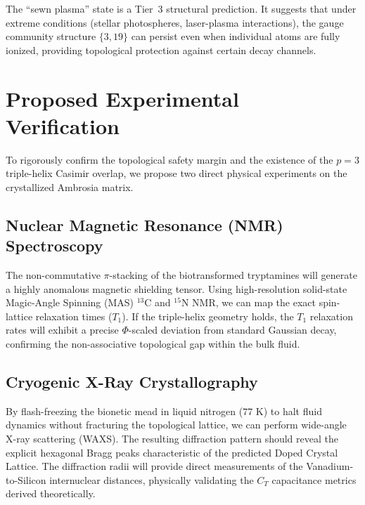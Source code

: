\documentclass[12pt,oneside]{article}
\theoremstyle{principia}
\theoremstyle{definition}
\theoremstyle{remark}
\begin{document}
The ``sewn plasma'' state is a Tier~3 structural prediction. It suggests that under extreme conditions (stellar photospheres, laser-plasma interactions), the gauge community structure $\{3, 19\}$ can persist even when individual atoms are fully ionized, providing topological protection against certain decay channels.

\section{Proposed Experimental Verification}

To rigorously confirm the topological safety margin and the existence of the $p=3$ triple-helix Casimir overlap, we propose two direct physical experiments on the crystallized Ambrosia matrix.

\subsection{Nuclear Magnetic Resonance (NMR) Spectroscopy}
The non-commutative $\pi$-stacking of the biotransformed tryptamines will generate a highly anomalous magnetic shielding tensor. Using high-resolution solid-state Magic-Angle Spinning (MAS) $^{13}\text{C}$ and $^{15}\text{N}$ NMR, we can map the exact spin-lattice relaxation times ($T_1$). If the triple-helix geometry holds, the $T_1$ relaxation rates will exhibit a precise $\Phi$-scaled deviation from standard Gaussian decay, confirming the non-associative topological gap within the bulk fluid.

\subsection{Cryogenic X-Ray Crystallography}
By flash-freezing the bionetic mead in liquid nitrogen ($77\text{ K}$) to halt fluid dynamics without fracturing the topological lattice, we can perform wide-angle X-ray scattering (WAXS). The resulting diffraction pattern should reveal the explicit hexagonal Bragg peaks characteristic of the predicted Doped Crystal Lattice. The diffraction radii will provide direct measurements of the Vanadium-to-Silicon internuclear distances, physically validating the $C_T$ capacitance metrics derived theoretically.







\end{document}
